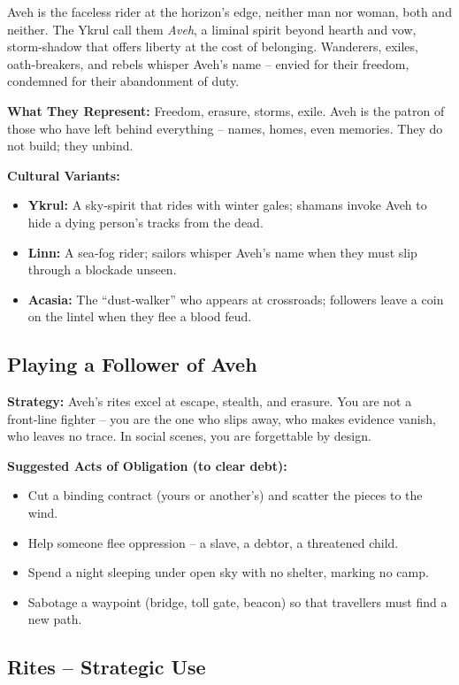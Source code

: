 \documentclass[10pt,a5paper]{book}
\begin{document}
Aveh is the faceless rider at the horizon’s edge, neither man nor woman, both and neither. The Ykrul call them \textit{Aveh}, a liminal spirit beyond hearth and vow, storm‑shadow that offers liberty at the cost of belonging. Wanderers, exiles, oath‑breakers, and rebels whisper Aveh’s name – envied for their freedom, condemned for their abandonment of duty.

\textbf{What They Represent:} Freedom, erasure, storms, exile. Aveh is the patron of those who have left behind everything – names, homes, even memories. They do not build; they unbind.

\textbf{Cultural Variants:}
\begin{itemize}
    \item \textbf{Ykrul:} A sky‑spirit that rides with winter gales; shamans invoke Aveh to hide a dying person’s tracks from the dead.
    \item \textbf{Linn:} A sea‑fog rider; sailors whisper Aveh’s name when they must slip through a blockade unseen.
    \item \textbf{Acasia:} The “dust‑walker” who appears at crossroads; followers leave a coin on the lintel when they flee a blood feud.
\end{itemize}

\subsection*{Playing a Follower of Aveh}

\textbf{Strategy:} Aveh’s rites excel at escape, stealth, and erasure. You are not a front‑line fighter – you are the one who slips away, who makes evidence vanish, who leaves no trace. In social scenes, you are forgettable by design.

\textbf{Suggested Acts of Obligation (to clear debt):}
\begin{itemize}
    \item Cut a binding contract (yours or another’s) and scatter the pieces to the wind.
    \item Help someone flee oppression – a slave, a debtor, a threatened child.
    \item Spend a night sleeping under open sky with no shelter, marking no camp.
    \item Sabotage a waypoint (bridge, toll gate, beacon) so that travellers must find a new path.
\end{itemize}

\subsection*{Rites – Strategic Use}
\end{document}
